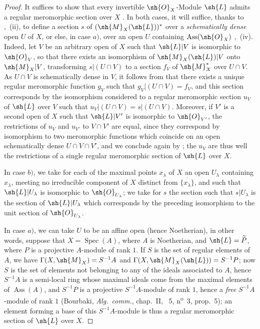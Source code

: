 \begin{proof}
It suffices to show that every invertible $\sh{O}_X$-Module $\sh{L}$ admits a regular meromorphic section over $X$ .
In both cases, it will suffice, thanks to ,~(ii), to define a section $s$ of $(\sh{M}_X(\sh{L}))^*$ over a \emph{schematically dense} open $U$ of $X$, or else, in case $a)$, over an open $U$ containing $\operatorname{Ass}(\sh{O}_X)$ ,~(iv).
Indeed, let $V$ be an arbitrary open of $X$ such that $\sh{L}|V$ is isomorphic to $\sh{O}_V$, so that there exists an isomorphism of $\sh{M}_X(\sh{L})|V$ onto $\sh{M}_X|V$, transforming $s|(U\cap V)$ to a section $f_V$ of $\sh{M}_X^*$ over $U\cap V$.
As $U\cap V$ is schematically dense in $V$, it follows from  that there exists a unique regular meromorphic function $g_V$ such that $g_V|(U\cap V)=f_V$, and this section corresponds by the isomorphism considered to a regular meromorphic section $u_V$ of $\sh{L}$ over $V$ such that $u_V|(U\cap V)=s|(U\cap V)$.
Moreover, if $V'$ is a second open of $X$ such that $\sh{L}|V'$ is isomorphic to $\sh{O}_{V'}$, the restrictions of $u_V$ and $u_{V'}$ to $V\cap V'$ are equal, since they correspond by isomorphism to two meromorphic functions which coincide on an open schematically dense $U\cap V\cap V'$, and we conclude again by ;
the $u_V$ are thus well the restrictions of a single regular meromorphic section of $\sh{L}$ over $X$.

In case $b)$, we take for each of the maximal points $x_\lambda$ of $X$ an open $U_\lambda$ containing $x_\lambda$, meeting no irreducible component of $X$ distinct from $\overline{\{x_\lambda\}}$, and such that $\sh{L}|U_\lambda$ is isomorphic to $\sh{O}_{U_\lambda}$;
we take for $s$ the section such that $s|U_\lambda$ is the section of $\sh{L}|U_\lambda$ which corresponds by the preceding isomorphism to the unit section of $\sh{O}_{U_\lambda}$.

In case $a)$, we can take $U$ to be an affine open (hence Noetherian), in other words, suppose that $X=\operatorname{Spec}(A)$, where $A$ is Noetherian, and $\sh{L}=\widetilde{P}$, where $P$ is a projective $A$-module of rank $1$.
If $S$ is the set of regular elements of $A$, we have $\Gamma(X,\sh{M}_X)=S^{-1}A$  and $\Gamma(X,\sh{M}_X(\sh{L}))=S^{-1}P$;
now $S$ is the set of elements not belonging to any of the ideals associated to $A$, hence $S^{-1}A$ is a semi-local ring whose maximal ideals come from the maximal elements of $\operatorname{Ass}(A)$, and $S^{-1}P$ is a projective $S^{-1}A$-module of rank $1$, hence a \emph{free} $S^{-1}A$-module of rank $1$ (Bourbaki, \emph{Alg.\ comm.}, chap.~II, \textsection~5, n\textsuperscript{o}~3, prop.~5);
an element forming a base of this $S^{-1}A$-module is thus  a regular meromorphic section of $\sh{L}$ over $X$.
\end{proof}

